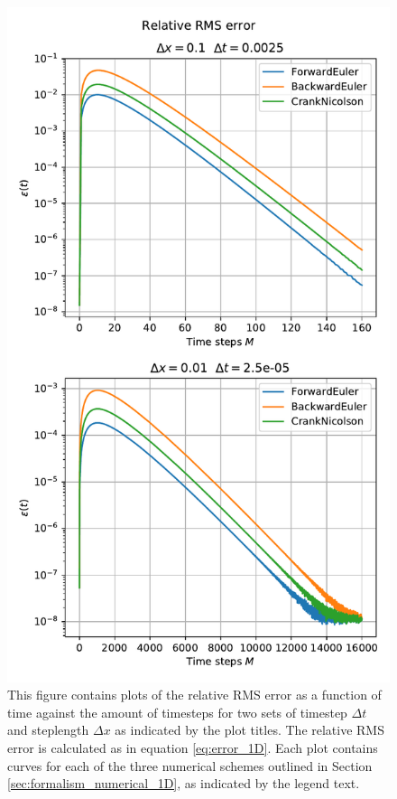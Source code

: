 \documentclass[reprint,english,notitlepage]{revtex4-1}  %
\begin{document}
\begin{figure}[H]
\centering
\includegraphics[width=\columnwidth]{../data/1D-RMS.pdf}
\caption{This figure contains plots of the relative RMS error as a function of time against the amount of timesteps for two sets of timestep $\Delta t$ and steplength $\Delta x$ as indicated by the plot titles. The relative RMS error is calculated as in equation \eqref{eq:error_1D}. Each plot contains curves for each of the three numerical schemes outlined in Section \ref{sec:formalism_numerical_1D}, as indicated by the legend text.} \label{fig:error_1D}
\end{figure}
\end{document}

